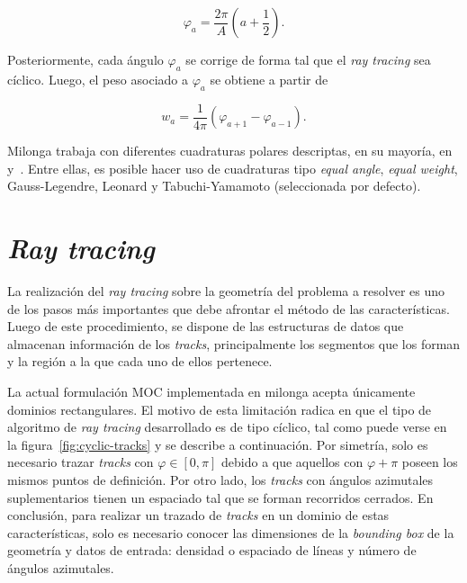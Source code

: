 \documentclass[11pt]{article}
\numberwithin{equation}{section}
\begin{document}
\begin{equation}
 \varphi_a = \frac{2\pi}{A} \left( a + \frac{1}{2} \right).
\end{equation}

\noindent
Posteriormente, cada ángulo $\varphi_a$ se corrige de forma tal que el \emph{ray tracing} sea cíclico. Luego, el peso asociado a $\varphi_a$ se obtiene a partir de

\begin{equation}
 w_a = \frac{1}{4\pi} \left( \varphi_{a+1} - \varphi_{a-1} \right).
\end{equation}

Milonga trabaja con diferentes cuadraturas polares descriptas, en su mayoría, en~\cite{handbook-ingnuclear} y~\cite{tabuchi}. Entre ellas, es posible hacer uso de cuadraturas tipo \emph{equal angle}, \emph{equal weight}, Gauss-Legendre, Leonard y Tabuchi-Yamamoto (seleccionada por defecto).


\section{\emph{Ray tracing}}\label{sec:ray-tracing}

La realizaci\'on del \emph{ray tracing} sobre la geometría del problema a resolver es uno de los pasos más importantes que debe afrontar el método de las características. Luego de este procedimiento, se dispone de las estructuras de datos que almacenan información de los \emph{tracks}, principalmente los segmentos que los forman y la región a la que cada uno de ellos pertenece. 

La actual formulación MOC implementada en milonga acepta únicamente dominios rectangulares. El motivo de esta limitación radica en que el tipo de algoritmo de \emph{ray tracing} desarrollado es de tipo c\'iclico, tal como puede verse en la figura~\ref{fig:cyclic-tracks} y se describe a continuación. Por simetr\'ia, solo es necesario trazar \emph{tracks} con $\varphi \in \left[ 0, \pi \right]$ debido a que aquellos con $\varphi + \pi$ poseen los mismos puntos de definición. Por otro lado, los \emph{tracks} con ángulos azimutales suplementarios tienen un espaciado tal que se forman recorridos cerrados. En conclusión, para realizar un trazado de \emph{tracks} en un dominio de estas características, solo es necesario conocer las dimensiones de la \emph{bounding box} de la geometría y datos de entrada: densidad o espaciado de líneas y número de ángulos azimutales.
\end{document}
